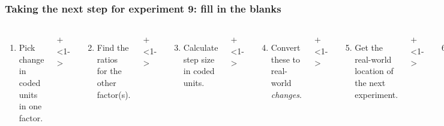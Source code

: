 \documentclass[handout,11pt,aspectratio=169,mathserif]{beamer}
\begin{document}
\begin{frame}\frametitle{Taking the next step for experiment 9: {\color{myOrange}fill in the blanks}}
	\begin{columns}[T]
		
			\vspace{0.1cm}
			{\tiny 
				\begin{enumerate}
					\item	Pick change in coded units in one factor.
				\end{enumerate}
			 \par}
			 
			\onslide+<1->{
				{\tiny 
					\begin{enumerate}\setcounter{enumi}{1}
						\item	Find the ratios for the other factor(s).
					\end{enumerate}
				
				\par}
			}
			
			\vspace{0.0cm}
			\onslide+<1->{
				{\tiny 
					\begin{enumerate}\setcounter{enumi}{2}
						\item	Calculate step size in coded units.
					\end{enumerate}
				
				\par}
			}
			
			\onslide+<1->{
				{\tiny 
					\begin{enumerate}\setcounter{enumi}{3}
						\item	Convert these to real-world \emph{changes}.
					\end{enumerate}
				
				\par}
			}
			
			\onslide+<1->{
				{\tiny 
					\begin{enumerate}\setcounter{enumi}{4}
						\item	Get the real-world location
						of the next experiment.
					\end{enumerate}
				
				\par}
			}
			
			
			\vspace{-0.2cm}
			\onslide+<1->{
				{\tiny 
					\begin{enumerate}\setcounter{enumi}{5}
						\item	Convert these back to coded-units.
					\end{enumerate}
				
}}
\end{columns}
\end{frame}
\end{document}

